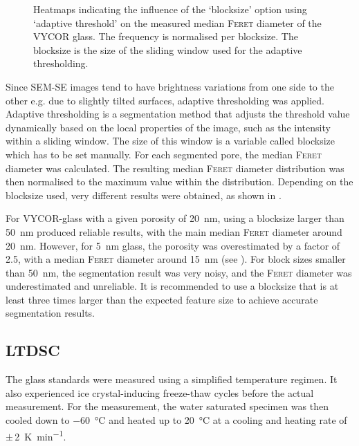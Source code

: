 \begin{figure}[htbp]
\begin{subfigure}[b]{0.52\textwidth}
	\end{subfigure}
	\caption{
		Heatmaps indicating the influence of the `blocksize' option using `adaptive threshold' on the measured median \textsc{Feret} diameter of the \textsc{VYCOR} glass.
		The frequency is normalised per blocksize.
		The blocksize is the size of the sliding window used for the adaptive thresholding.
	}
	\label{fig:heatmap_vycor}
\end{figure}


Since \ac{SEM}-\ac{SE} images tend to have brightness variations from one side to the other e.g. due to slightly tilted surfaces, adaptive thresholding was applied.
Adaptive thresholding is a segmentation method that adjusts the threshold value dynamically based on the local properties of the image, such as the intensity within a sliding window.
The size of this window is a variable called blocksize which has to be set manually.
For each segmented pore, the median \textsc{Feret} diameter was calculated.
The resulting median \textsc{Feret} diameter distribution was then normalised to the maximum value within the distribution.
Depending on the blocksize used, very different results were obtained, as shown in .

For \textsc{VYCOR}-glass with a given porosity of \qty{20}{\nano\meter}, using a blocksize larger than \qty{50}{\nano\meter} produced reliable results, with the main median \textsc{Feret} diameter around \qty{20}{\nano\meter}.
However, for \qty{5}{\nano\meter} glass, the porosity was overestimated by a factor of \num{2.5}, with a median \textsc{Feret} diameter around \qty{15}{\nano\meter} (see ).
For block sizes smaller than \qty{50}{\nano\meter}, the segmentation result was very noisy, and the \textsc{Feret} diameter was underestimated and unreliable.
It is recommended to use a blocksize that is at least three times larger than the expected feature size to achieve accurate segmentation results.




\FloatBarrier
\subsection{\acs*{LTDSC}}

The glass standards were measured using a simplified temperature regimen.
It also experienced ice crystal-inducing freeze-thaw cycles before the actual measurement.
For the measurement, the water saturated specimen was then cooled down to \qty{-60}{\celsius} and heated up to \qty{20}{\celsius} at a cooling and heating rate of $\pm$\,\qty{2}{\kelvin\per\minute}.


